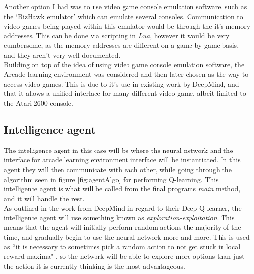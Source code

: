 \documentclass[10pt]{article}
\begin{document}
		Another option I had was to use video game console emulation software, such as the `BizHawk emulator'\cite{biz} which can emulate several consoles. Communication to video games being played within this emulator would be through the it's memory addresses. This can be done via scripting in \textit{Lua}, however it would be very cumbersome, as the memory addresses are different on a game-by-game basis, and they aren't very well documented.\\
		
		Building on top of the idea of using video game console emulation software, the Arcade learning environment was considered and then later chosen as the way to access video games. This is due to it's use in existing work by DeepMind, and that it allows a unified interface for many different video game, albeit limited to the Atari 2600 console.\\	
	
	\bigskip	
	
	\subsection{Intelligence agent}
	
		The intelligence agent in this case will be where the neural network and the interface for arcade learning environment interface will be instantiated. In this agent they will then communicate with each other, while going through the algorithm seen in figure \ref{fig:agentAlgo} for performing Q-learning. This intelligence agent is what will be called from the final programs \textit{main} method, and it will handle the rest.\\
		
		As outlined in the work from DeepMind in regard to their Deep-Q learner, the intelligence agent will use something known as \textit{exploration-exploitation}. This means that the agent will initially perform random actions the majority of the time, and gradually begin to use the neural network more and more. This is used as ``it is necessary to sometimes pick a random action to not get stuck in local reward maxima" \cite{repli}, so the network will be able to explore more options than just the action it is currently thinking is the most advantageous.\\
		
\end{document}
